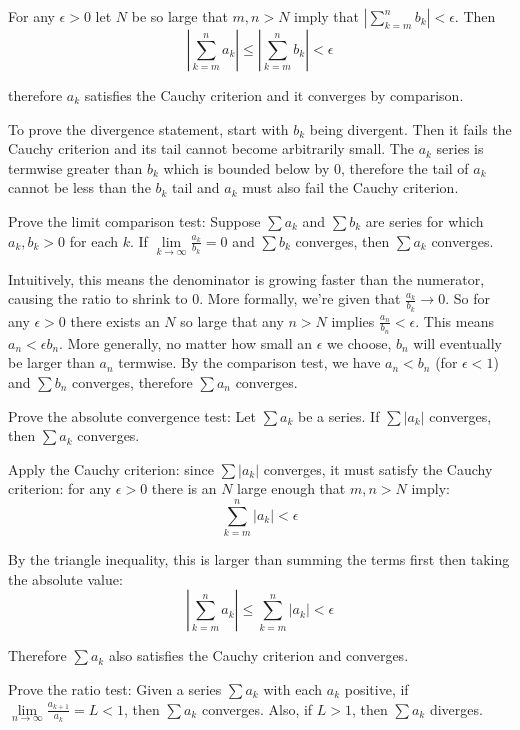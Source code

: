 \documentclass{article}
\begin{document}
For any $\epsilon > 0$ let $N$ be so large that $m, n > N$ imply that $\left|\sum_{k = m}^n b_k\right| < \epsilon$. Then
$$\left|\sum_{k = m}^n a_k\right| \leq \left|\sum_{k = m}^n b_k\right| < \epsilon$$

therefore $a_k$ satisfies the Cauchy criterion and it converges by comparison.

To prove the divergence statement, start with $b_k$ being divergent. Then it fails the Cauchy criterion and its tail cannot become arbitrarily small. The $a_k$ series is termwise greater than $b_k$ which is bounded below by 0, therefore the tail of $a_k$ cannot be less than the $b_k$ tail and $a_k$ must also fail the Cauchy criterion.

\begin{problem}
Prove the limit comparison test: Suppose $\sum a_k$ and $\sum b_k$ are series for which $a_k, b_k > 0$ for each $k$. If $\lim\limits_{k \to \infty} \frac{a_k}{b_k} = 0$ and $\sum b_k$ converges, then $\sum a_k$ converges.
\end{problem}

Intuitively, this means the denominator is growing faster than the numerator, causing the ratio to shrink to 0. More formally, we're given that $\frac{a_k}{b_k} \to 0$. So for any $\epsilon > 0$ there exists an $N$ so large that any $n > N$ implies $\frac{a_n}{b_n} < \epsilon$. This means $a_n < \epsilon b_n$. More generally, no matter how small an $\epsilon$ we choose, $b_n$ will eventually be larger than $a_n$ termwise. By the comparison test, we have $a_n < b_n$ (for $\epsilon < 1$) and $\sum b_n$ converges, therefore $\sum a_n$ converges.

\begin{problem}
Prove the absolute convergence test: Let $\sum a_k$ be a series. If $\sum |a_k|$ converges, then $\sum a_k$ converges.
\end{problem}

Apply the Cauchy criterion: since $\sum |a_k|$ converges, it must satisfy the Cauchy criterion: for any $\epsilon > 0$ there is an $N$ large enough that $m, n > N$ imply:
$$\sum_{k = m}^n |a_k| < \epsilon$$

By the triangle inequality, this is larger than summing the terms first then taking the absolute value:
$$\left|\sum_{k=m}^{n} a_k \right| \leq \sum_{k=m}^{n} |a_k| < \epsilon$$

Therefore $\sum a_k$ also satisfies the Cauchy criterion and converges.

\begin{problem}
Prove the ratio test: Given a series $\sum a_k$ with each $a_k$ positive, if $\lim\limits_{n\to\infty} \frac{a_{k + 1}}{a_k} = L < 1$, then $\sum a_k$ converges. Also, if $L > 1$, then $\sum a_k$ diverges.
\end{problem}
\end{document}
